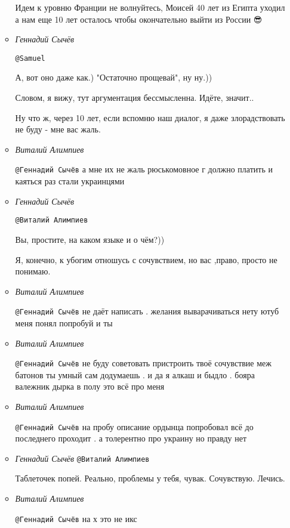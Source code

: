 \begin{itemize}
\begin{itemize}
Идем к уровню Франции не волнуйтесь, Моисей 40 лет из Египта уходил а нам еще
10 лет осталось чтобы окончательно выйти из России 😎


\item \emph{Геннадий Сычёв}

\verb|@Samuel|  

А, вот оно даже как.) "Остаточно прощевай", ну ну.))

Словом, я вижу, тут аргументация бессмысленна. Идёте, значит.. 

Ну что ж, через 10 лет, если вспомню наш диалог, я даже злорадствовать не буду - мне вас жаль.

\item \emph{Виталий Алимпиев}

\verb|@Геннадий Сычёв|  а мне их не жаль рюськомовное г должно платить и каяться раз стали украинцями

\item \emph{Геннадий Сычёв}

\verb|@Виталий Алимпиев|  

Вы, простите, на каком языке и о чём?)) 

Я, конечно, к убогим отношусь с сочувствием, но вас ,право, просто не понимаю.

\item \emph{Виталий Алимпиев}

\verb|@Геннадий Сычёв|  не даёт написать . желания выварачиваться нету ютуб меня понял попробуй и ты

\item \emph{Виталий Алимпиев}

\verb|@Геннадий Сычёв|  не буду советовать пристроить твоё сочувствие меж батонов ты
умный сам додумаешь . и да я алкаш и быдло . бояра валежник дырка в полу это
всё про меня

\item \emph{Виталий Алимпиев}

\verb|@Геннадий Сычёв|  на пробу описание ордынца попробовал всё до последнего проходит . а толерентно про украину но правду нет

\item \emph{Геннадий Сычёв}
\verb|@Виталий Алимпиев| 

Таблеточек попей.
Реально, проблемы у тебя, чувак.
Сочувствую.
Лечись.

\item \emph{Виталий Алимпиев}

\verb|@Геннадий Сычёв|  на  х это не икс


\end{itemize}
\end{itemize}
